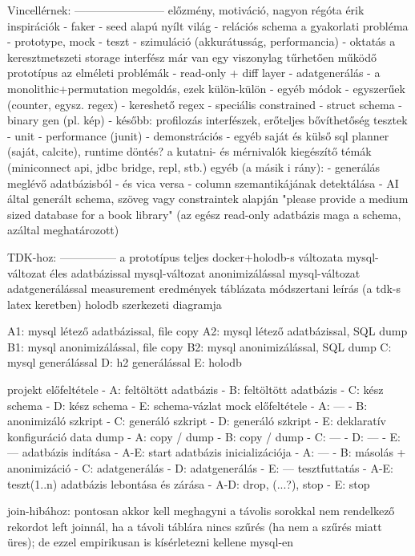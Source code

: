 \documentclass[
    parspace,
    noindent,
    nohyp,
]{elteiktdk}[2023/04/10]
\begin{document}
{Vincellérnek:
------------------------
előzmény, motiváció, nagyon régóta érik
inspirációk
  - faker
  - seed alapú nyílt világ
  - relációs schema
a gyakorlati probléma
  - prototype, mock
  - teszt
  - szimuláció (akkurátusság, performancia)
  - oktatás
a keresztmetszeti storage interfész
már van egy viszonylag tűrhetően működő prototípus
az elméleti problémák
  - read-only + diff layer
  - adatgenerálás
     - a monolithic+permutation megoldás, ezek külön-külön
     - egyéb módok
         - egyszerűek (counter, egysz. regex)
         - kereshető regex
         - speciális constrained
         - struct schema
         - binary gen (pl. kép)
  - később: profilozás
interfészek, erőteljes bővíthetőség
tesztek
  - unit
  - performance (junit)
  - demonstrációs
  - egyéb
saját és külső sql planner (saját, calcite), runtime döntés?
a kutatni- és mérnivalók
kiegészítő témák (miniconnect api, jdbc bridge, repl, stb.)
egyéb (a másik i rány):
   - generálás meglévő adatbázisból
      - és vica versa
      - column szemantikájának detektálása
   - AI által generált schema, szöveg vagy constraintek alapján
     "please provide a medium sized database for a book library"
        (az egész read-only adatbázis maga a schema, azáltal meghatározott)

TDK-hoz:
---------------
a prototípus teljes docker+holodb-s változata
mysql-változat éles adatbázissal
mysql-változat anonimizálással
mysql-változat adatgenerálással
measurement
eredmények táblázata
módszertani leírás (a tdk-s latex keretben)
holodb szerkezeti diagramja

A1: mysql létező adatbázissal, file copy
A2: mysql létező adatbázissal, SQL dump
B1: mysql anonimizálással, file copy
B2: mysql anonimizálással, SQL dump
C: mysql generálással
D: h2 generálással
E: holodb

projekt előfeltétele
- A: feltöltött adatbázis
- B: feltöltött adatbázis
- C: kész schema
- D: kész schema
- E: schema-vázlat
mock előfeltétele
- A: ---
- B: anonimizáló szkript
- C: generáló szkript
- D: generáló szkript
- E: deklaratív konfiguráció
data dump
- A: copy / dump
- B: copy / dump
- C: ---
- D: ---
- E: ---
adatbázis indítása
- A-E: start
adatbázis inicializációja
- A: ---
- B: másolás + anonimizáció
- C: adatgenerálás
- D: adatgenerálás
- E: ---
tesztfuttatás
- A-E: teszt(1..n)
adatbázis lebontása és zárása
- A-D: drop, (...?), stop
- E: stop

join-hibához:
pontosan akkor kell meghagyni a távolis sorokkal nem rendelkező rekordot left joinnál, ha a távoli táblára nincs szűrés (ha nem a szűrés miatt üres); de ezzel empirikusan is kísérletezni kellene mysql-en

}
\end{document}

